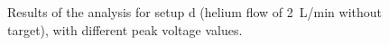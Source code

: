 \begin{figure}
{ }
 \hfill
 \caption{Results of the analysis for setup d (helium flow of \SI{2}{\liter/\minute} without target), with different peak voltage values.}
 \label{fig:elio_d}
\end{figure}

